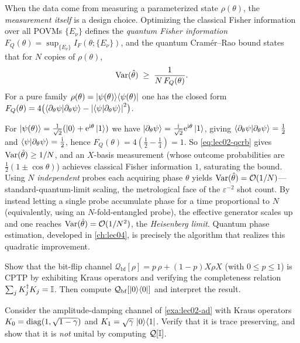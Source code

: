 When the data come from measuring a parameterized state $\rho(\theta)$, the
\emph{measurement itself} is a design choice. Optimizing the classical Fisher
information over all POVMs $\{E_\nu\}$ defines the \emph{quantum Fisher information}
$F_Q(\theta)=\sup_{\{E_\nu\}}I_F(\theta;\{E_\nu\})$, and the quantum Cram\'er--Rao
bound states that for $N$ copies of $\rho(\theta)$,
\begin{equation}\label{eq:lec02-qcrb}
  \operatorname{Var}(\hat\theta)\;\ge\;\frac{1}{N\,F_Q(\theta)} .
\end{equation}
For a pure family $\rho(\theta)=\ket{\psi(\theta)}\!\bra{\psi(\theta)}$ one has the closed form
$F_Q(\theta)=4\bigl(\braket{\partial_\theta\psi|\partial_\theta\psi}
-\left\lvert \braket{\psi|\partial_\theta\psi} \right\rvert^{2}\bigr)$.

\begin{example}\label{exa:lec02-phase}
For $\ket{\psi(\theta)}=\tfrac{1}{\sqrt2}(\ket{0}+\mathrm{e}^{\mathrm{i}\theta}\ket{1})$ we have
$\ket{\partial_\theta\psi}=\tfrac{\mathrm{i}}{\sqrt2}\mathrm{e}^{\mathrm{i}\theta}\ket{1}$, giving
$\braket{\partial_\theta\psi|\partial_\theta\psi}=\tfrac12$ and
$\braket{\psi|\partial_\theta\psi}=\tfrac{\mathrm{i}}{2}$, hence
$F_Q(\theta)=4(\tfrac12-\tfrac14)=1$. So \eqref{eq:lec02-qcrb} gives
$\operatorname{Var}(\hat\theta)\ge1/N$, and an $X$-basis measurement (whose outcome probabilities
are $\tfrac12(1\pm\cos\theta)$) achieves classical Fisher information $1$, saturating
the bound. Using $N$ \emph{independent} probes each acquiring phase $\theta$ yields
$\operatorname{Var}(\hat\theta)=\mathcal{O}(1/N)$---standard-quantum-limit scaling, the metrological
face of the $\varepsilon^{-2}$ shot count. By instead letting a single probe
accumulate phase for a time proportional to $N$ (equivalently, using an
$N$-fold-entangled probe), the effective generator scales up and one reaches
$\operatorname{Var}(\hat\theta)=\mathcal{O}(1/N^{2})$, the \emph{Heisenberg limit}. Quantum phase
estimation, developed in \cref{ch:lec04}, is precisely the algorithm that realizes
this quadratic improvement.
\end{example}

\exercisesection
\begin{exercise}\label{ex:lec02-1}
Show that the bit-flip channel $\mathcal{Q}_{\mathrm{bf}}[\rho]=p\,\rho+(1-p)X\rho X$
(with $0\le p\le1$) is CPTP by exhibiting Kraus operators and verifying the
completeness relation $\sum_j K_j^{\dagger} K_j=\mathbb{I}$. Then compute
$\mathcal{Q}_{\mathrm{bf}}[\ket{0}\!\bra{0}]$ and interpret the result.
\end{exercise}

\begin{exercise}\label{ex:lec02-2}
Consider the amplitude-damping channel of \cref{exa:lec02-ad} with Kraus operators
$K_0=\operatorname{diag}(1,\sqrt{1-\gamma})$ and
$K_1=\sqrt{\gamma}\,\ket{0}\!\bra{1}$. Verify that it is trace preserving, and show
that it is \emph{not} unital by computing $\mathcal{Q}[\mathbb{I}]$.
\end{exercise}

